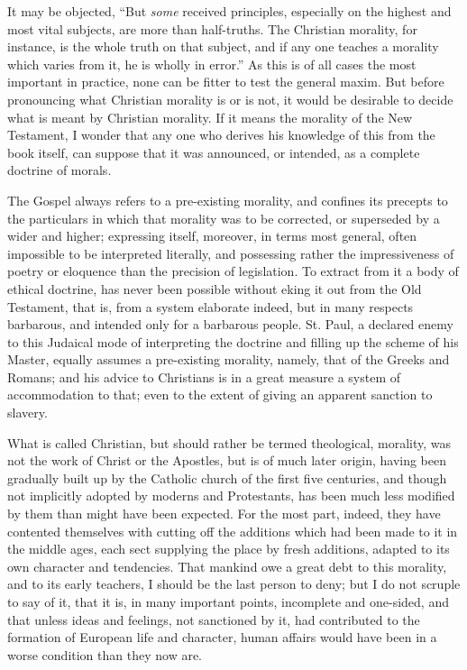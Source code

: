 It may be objected, “But \textit{some} received principles, especially on the highest and most vital subjects, are more than half-truths. The Christian morality, for instance, is the whole truth on that subject, and if any one teaches a morality which varies from it, he is wholly in error.” As this is of all cases the most important in practice, none can be fitter to test the general maxim. But before pronouncing what Christian morality is or is not, it would be desirable to decide what is meant by Christian morality. If it means the morality of the New Testament, I wonder that any one who derives his knowledge of this from the book itself, can suppose that it was announced, or intended, as a complete doctrine of morals.\par

The Gospel always refers to a pre-existing morality, and confines its precepts to the particulars in which that morality was to be corrected, or superseded by a wider and higher; expressing itself, moreover, in terms most general, often impossible to be interpreted literally, and possessing rather the impressiveness of poetry or eloquence than the precision of legislation. To extract from it a body of ethical doctrine, has never been possible without eking it out from the Old Testament, that is, from a system elaborate indeed, but in many respects barbarous, and intended only for a barbarous people. St. Paul, a declared enemy to this Judaical mode of interpreting the doctrine and filling up the scheme of his Master, equally assumes a pre-existing morality, namely, that of the Greeks and Romans; and his advice to Christians is in a great measure a system of accommodation to that; even to the extent of giving an apparent sanction to slavery.\par

What is called Christian, but should rather be termed theological, morality, was not the work of Christ or the Apostles, but is of much later origin, having been gradually built up by the Catholic church of the first five centuries, and though not implicitly adopted by moderns and Protestants, has been much less modified by them than might have been expected. For the most part, indeed, they have contented themselves with cutting off the additions which had been made to it in the middle ages, each sect supplying the place by fresh additions, adapted to its own character and tendencies. That mankind owe a great debt to this morality, and to its early teachers, I should be the last person to deny; but I do not scruple to say of it, that it is, in many important points, incomplete and one-sided, and that unless ideas and feelings, not sanctioned by it, had contributed to the formation of European life and character, human affairs would have been in a worse condition than they now are.\par

